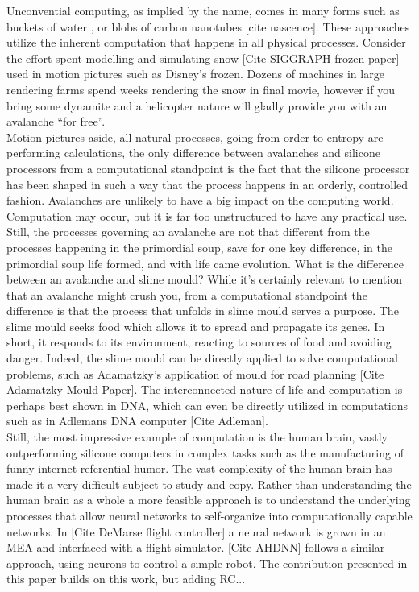 Unconvential computing, as implied by the name, comes in many forms such as
buckets of water \cite{fernando_pattern_2003}, or blobs of carbon nanotubes [cite nascence].
These approaches utilize the inherent computation that happens in all physical
processes.
Consider the effort spent modelling and simulating snow [Cite SIGGRAPH frozen
paper] used in motion pictures such as Disney's frozen. Dozens of machines in
large rendering farms spend weeks rendering the snow in final movie, however if
you bring some dynamite and a helicopter nature will gladly provide you with an
avalanche ``for free''.\\
Motion pictures aside, all natural
processes, going from order to entropy are performing calculations, the only
difference between avalanches and silicone processors from a computational
standpoint is the fact that the silicone processor has been shaped in such a way
that the process happens in an orderly, controlled fashion. Avalanches are
unlikely to have a big impact on the computing world.
Computation may occur, but it is far too unstructured to have any
practical use. Still, the processes governing an avalanche are not that
different from the processes happening in the primordial soup, save for one key
difference, in the primordial soup life formed, and with life came evolution.
What is the difference between an avalanche and slime mould? While it's
certainly relevant to mention that an avalanche might crush you, from a
computational standpoint the difference is that the process that unfolds in
slime mould serves a purpose. The slime mould seeks food which allows it to
spread and propagate its genes. In short, it responds to its environment,
reacting to sources of food and avoiding danger. Indeed, the slime mould can be
directly applied to solve computational problems, such as Adamatzky's
application of mould for road planning [Cite Adamatzky Mould Paper]. The
interconnected nature of life and computation is perhaps best shown in DNA,
which can even be directly utilized in computations such as in Adlemans DNA
computer [Cite Adleman].\\
Still, the most impressive example of computation is the human brain, vastly
outperforming silicone computers in complex tasks such as the manufacturing of
funny internet referential humor. 
The vast complexity of the human brain has made it a very difficult subject to
study and copy. Rather than understanding the human brain as a whole a more
feasible approach is to understand the underlying processes that allow neural
networks to self-organize into computationally capable networks.
In [Cite DeMarse flight controller] a neural network is grown in an MEA and
interfaced with a flight simulator. [Cite AHDNN] follows a similar approach,
using neurons to control a simple robot. The contribution presented in this
paper builds on this work, but adding RC...

\cleardoublepage

